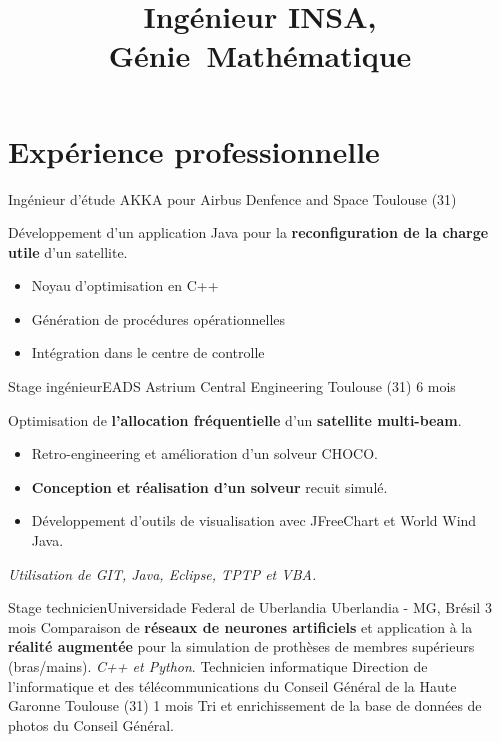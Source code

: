 \documentclass[10pt,a4paper,sans]{moderncv}%
\title{Ingénieur INSA, \mbox{Génie Mathématique}}
\begin{document}
\maketitle
\vspace{-1cm} %

\section{Expérience professionnelle}
    {Ingénieur d'étude}
    {AKKA pour Airbus Denfence and Space}
    {Toulouse (31)}{}
    {
        Développement d'un application Java pour la \textbf{reconfiguration de la charge utile} d'un satellite.
        \begin{itemize}
            \item Noyau d'optimisation en C++
            \item Génération de procédures opérationnelles
            \item Intégration dans le centre de controlle
        \end{itemize}
    }
    {Stage ingénieur}{EADS Astrium Central Engineering}
    {Toulouse (31)}
    {6 mois}
    {
        Optimisation de \textbf{l'allocation fréquentielle} d'un \textbf{satellite multi-beam}.
        \begin{itemize}
            \item Retro-engineering et amélioration d'un solveur CHOCO.
            \item \textbf{Conception et réalisation d'un solveur} recuit simulé.
            \item Développement d'outils de visualisation avec JFreeChart et World Wind Java.
        \end{itemize}
        \textit{Utilisation  de GIT, Java, Eclipse, TPTP et VBA.}
    }
    {Stage technicien}{Universidade Federal de Uberlandia}
    {Uberlandia - MG, Brésil}
    {3 mois}
    {Comparaison de \textbf{réseaux de neurones artificiels} et application à la \textbf{réalité augmentée} pour la simulation de prothèses de membres supérieurs (bras/mains). \textit{C++ et Python}.}
    {Technicien informatique}
    {Direction de l'informatique et des télécommunications du Conseil Général de la Haute Garonne}
    {Toulouse (31)}
    {1 mois}
    {Tri et enrichissement de la base de données de photos du Conseil Général.}
\end{document}
